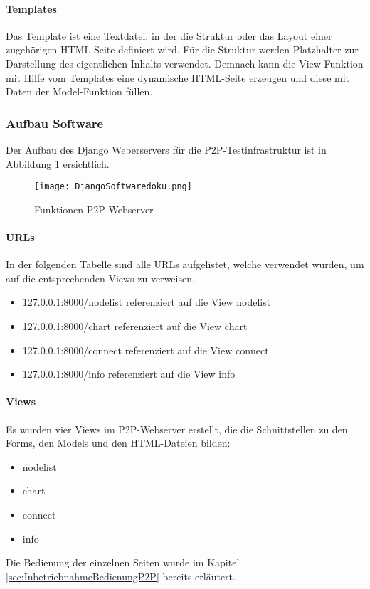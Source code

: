 \paragraph{Templates}
Das Template ist eine Textdatei, in der die Struktur oder das Layout einer zugehörigen HTML-Seite definiert wird.
Für die Struktur werden Platzhalter zur Darstellung des eigentlichen Inhalts verwendet.
Demnach kann die View-Funktion mit Hilfe vom Templates eine dynamische HTML-Seite erzeugen und diese mit Daten der Model-Funktion füllen.

\subsubsection{Aufbau Software}\label{subsubsec:SoftwareAufbau}
Der Aufbau des Django Weberservers für die P2P-Testinfrastruktur ist in Abbildung \ref{fig:FunktionenP2PWebserver} ersichtlich.

\begin{figure} [H]
	\centering
	\texttt{[image: DjangoSoftwaredoku.png]}
	\caption{Funktionen P2P Webserver}
	\label{fig:FunktionenP2PWebserver}
\end{figure}


\paragraph{URLs}
In der folgenden Tabelle sind alle URLs aufgelistet, welche verwendet wurden, um auf die entsprechenden Views zu verweisen.

\begin{itemize}
	\item 127.0.0.1:8000/node\textunderscore list \hspace{2.5mm} referenziert auf die View node\textunderscore list
	\item 127.0.0.1:8000/chart \hspace{10mm} referenziert auf die View chart
	\item 127.0.0.1:8000/connect \hspace{6mm} referenziert auf die View connect
	\item 127.0.0.1:8000/info \hspace{12.5mm} referenziert auf die View info
\end{itemize} 

\paragraph{Views}
Es wurden vier Views im P2P-Webserver erstellt, die die Schnittstellen zu den Forms, den Models und den HTML-Dateien bilden:
\begin{itemize}
	\item node\textunderscore list
	\item chart
	\item connect
	\item info
\end{itemize} 
Die Bedienung der einzelnen Seiten wurde im Kapitel \ref{sec:InbetriebnahmeBedienungP2P} bereits erläutert.

